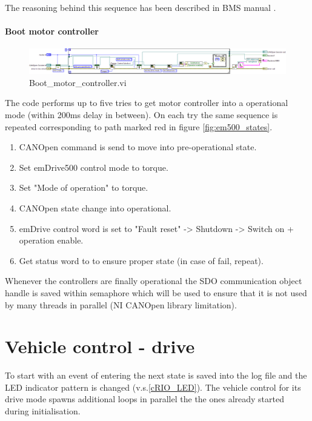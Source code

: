 The reasoning behind this sequence has been described in BMS manual \cite{BMS_manual}.

\paragraph{Boot motor controller} \label{sec:into_drive_mode}
\begin{figure}[H]
    \centering
    \includegraphics[scale=\visc,max width=\textwidth]{figures/Boot_Motor_Controlerd}
    \caption{Boot\_motor\_controller.vi}
    \label{vi:boot_MC}
\end{figure}
The code performs up to five tries to get motor controller into a operational mode (within 200ms delay in between). On each try the same sequence is repeated corresponding to path marked red in figure \ref{fig:em500_states}.
\begin{enumerate} 
    \itemsep0.1em 
    \item CANOpen command is send to move into pre-operational state.
    \item Set emDrive500 control mode to torque.
    \item Set "Mode of operation" to torque.
    \item CANOpen state change into operational.
    \item emDrive control word is set to "Fault reset" -> Shutdown -> Switch on + operation enable.
    \item Get status word to to ensure proper state (in case of fail, repeat).
\end{enumerate}

Whenever the controllers are finally operational the SDO communication object handle is saved within semaphore which will be used to ensure that it is not used by many threads in parallel (NI CANOpen library limitation).

\vspace{1em}
\noindent{}

\section{Vehicle control - drive}
To start with an event of entering the next state is saved into the log file and the LED indicator pattern is changed (v.s.\ref{cRIO_LED}). The vehicle control for its drive mode spawns additional loops in parallel the the ones already started during initialisation.

